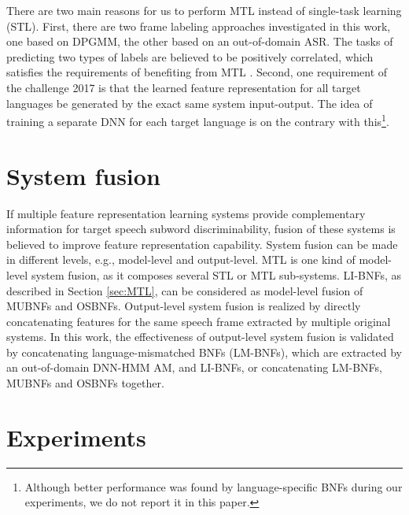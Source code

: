 \documentclass[a4paper]{article}
\begin{document}
There are two main reasons for us to perform MTL instead of single-task learning (STL). 
First, there are two frame labeling approaches investigated in this work, one based on DPGMM, the other based on an out-of-domain ASR.
The tasks of predicting two types of labels are believed to be positively correlated, which satisfies the requirements of benefiting from MTL \cite{caruana1998multitask}.
Second, one requirement of the challenge 2017 is that the learned feature representation for all target languages be generated by the exact same system input-output. The idea of training a separate DNN for each target language is on the contrary with this\footnote{\label{footnote:ffnn}Although better  performance was found by language-specific BNFs during our experiments, we do not report it in this paper.}. 

\section{System fusion}
If multiple feature representation learning systems provide complementary information for target speech subword discriminability, fusion of these systems is believed to improve feature representation capability.
System fusion can be made in different levels, e.g., model-level and output-level. MTL is one kind of model-level system fusion, as it composes several STL or MTL sub-systems. LI-BNFs, as described in Section \ref{sec:MTL}, can be considered as model-level fusion of MUBNFs and OSBNFs. Output-level system fusion is realized by directly concatenating features for the same speech frame extracted by multiple original systems. 
In this work, the effectiveness of output-level system fusion is validated by concatenating language-mismatched BNFs (LM-BNFs), which are extracted by an out-of-domain DNN-HMM AM, and  LI-BNFs, or concatenating LM-BNFs, MUBNFs and OSBNFs together. 

\section{Experiments}
\end{document}
